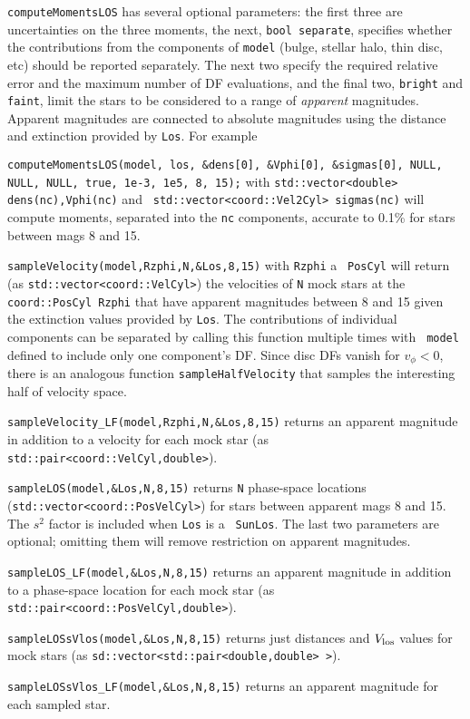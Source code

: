 \nwsec
{\tt computeMomentsLOS} has several optional
parameters: the first three are uncertainties on the three moments, the next,
{\tt bool separate}, specifies whether the contributions from the components
of {\tt model} (bulge, stellar halo, thin disc, etc) should be reported
separately. The next two specify the required relative error and the maximum
number of DF evaluations, and the final two, {\tt bright} and {\tt faint},
limit the stars to be considered to a range of {\it apparent} magnitudes.
Apparent magnitudes are connected to absolute magnitudes using the distance
and extinction provided by {\tt Los}. For example

\vskip-8pt
\nwsec
{\tt computeMomentsLOS(model, los, \&dens[0], \&Vphi[0],
			       \&sigmas[0], NULL, NULL, NULL, true, 1e-3,
1e5, 8, 15);}
 with {\tt std::vector<double> dens(nc),Vphi(nc)} and\hfil{} {\tt
std::vector<coord::Vel2Cyl> sigmas(nc)} will compute moments, separated into
the {\tt nc} components, accurate to 0.1\% for stars between mags 8 and 15.

\nwsec
 {\tt sampleVelocity(model,Rzphi,N,\&Los,8,15)} with {\tt Rzphi} a {\tt
PosCyl} will return (as\hfil{} {\tt std::vector<coord::VelCyl>})
the velocities of {\tt N} mock stars at the {\tt coord::PosCyl Rzphi} that
have apparent magnitudes between 8 and 15 given the extinction values
provided by {\tt Los}. The contributions of individual
components can be separated by calling this function multiple times with {\tt
model} defined to include only one component's DF.  Since disc DFs vanish for
$v_\phi<0$, there is an analogous function {\tt sampleHalfVelocity} that
samples the interesting half of velocity space.

\nwsec
{\tt sampleVelocity\_LF(model,Rzphi,N,\&Los,8,15)} returns an apparent
magnitude in addition to a velocity for each mock star (as {\tt
std::pair<coord::VelCyl,double>}).

\nwsec
{\tt sampleLOS(model,\&Los,N,8,15)} returns {\tt N} phase-space
locations ({\tt std::vector<coord::PosVelCyl>}) for stars between apparent
mags 8 and 15.  The $s^2$ factor is included when {\tt Los} is a {\tt
SunLos}. The
last two parameters are optional; omitting them will remove restriction on
apparent magnitudes.

\nwsec
{\tt sampleLOS\_LF(model,\&Los,N,8,15)} returns an apparent
magnitude in addition to a phase-space location for each mock star (as {\tt
std::pair<coord::PosVelCyl,double>}).

\nwsec
{\tt sampleLOSsVlos(model,\&Los,N,8,15)} returns just distances and $V_{\rm
los}$ values for mock stars (as {\tt sd::vector<std::pair<double,double>
>}). 



\bye

\nwsec
{\tt sampleLOSsVlos\_LF(model,\&Los,N,8,15)} returns an apparent magnitude
for each sampled star.
